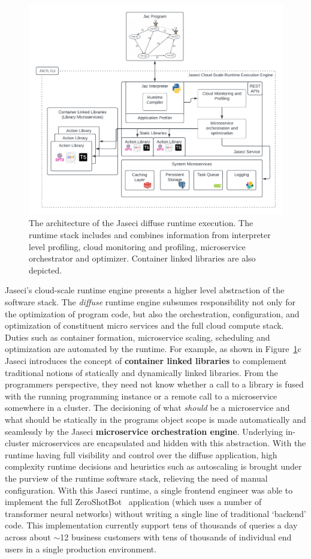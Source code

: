 \begin{figure}[tb]
    \centering
    \includegraphics[width=\linewidth]{figures/jaseci_arch.pdf}
    \caption{The architecture of the Jaseci diffuse runtime execution. The runtime stack includes and combines information from interpreter level profiling, cloud monitoring and profiling, microservice orchestrator and optimizer. Container linked libraries are also depicted. }
    \label{fig:benefit2}
\end{figure}

Jaseci's cloud-scale runtime engine presents a higher level abstraction of the software stack.
The \emph{diffuse} runtime engine subsumes responsibility not only for the optimization of program code, but also the orchestration, configuration, and optimization of constituent micro services and the full cloud compute stack.
Duties such as container formation, microservice scaling, scheduling and optimization are automated by the runtime.
For example, as shown in Figure~\ref{fig:benefit2}c Jaseci introduces the concept of \textbf{container linked libraries} to complement traditional notions of statically and dynamically linked libraries.
From the programmers perspective, they need not know whether a call to a library is fused with the running programming instance or a remote call to a microservice somewhere in a cluster.
The decisioning of what \emph{should} be a microservice and what should be statically in the programs object scope is made automatically and seamlessly by the Jaseci \textbf{microservice orchestration engine}.
Underlying in-cluster microservices are encapsulated and hidden with this abstraction.
With the runtime having full visibility and control over the diffuse application, high complexity runtime decisions and heuristics such as autoscaling is brought under the purview of the runtime software stack, relieving the need of manual configuration.
With this Jaseci runtime, a single frontend engineer was able to implement the full ZeroShotBot~\cite{zsb-website} application (which uses a number of transformer neural networks) without writing a single line of traditional `backend' code.
This implementation currently support tens of thousands of queries a day across about $\sim$12 business customers with tens of thousands of individual end users in a single production environment.